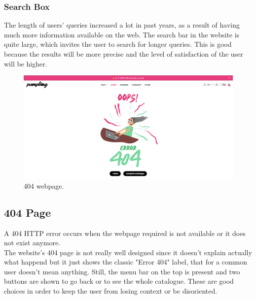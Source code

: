 \subsubsection{Search Box}
The length of users' queries increased a lot in past years, as a result of having much more information available on the web.
The search bar in the website is quite large, which invites the user to search for longer queries. This is good because 
the results will be more precise and the level of satisfaction of the user will be higher. 

\begin{figure}[h!]
	\centering
	\includegraphics[scale=0.225]{images/404.png}
	\caption{404 webpage.}
	\label{fig:404}
\end{figure}
\subsection{404 Page}

A 404 HTTP error occurs when the webpage required is not available or it does not exist anymore. \\
The website's 404 page is not really well designed since it doesn't explain actually what happend but it just shows the
classic "Error 404" label, that for a common user doesn't mean anything.
Still, the menu bar on the top is present and two buttons are shown to go back or to see the whole catalogue.
These are good choices in order to keep the user from losing context or be disoriented.

